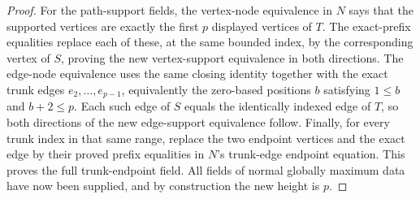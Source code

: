 \begin{proof}
For the path-support fields, the vertex-node equivalence in $N$ says that
the supported vertices are exactly the first $p$ displayed vertices of
$T$.  The exact-prefix equalities replace each of these, at the same
bounded index, by the corresponding vertex of $S$, proving the new
vertex-support equivalence in both directions.  The edge-node equivalence
uses the same closing identity together with the exact trunk edges
$e_2,\ldots,e_{p-1}$, equivalently the zero-based positions $b$ satisfying
$1\le b$ and $b+2\le p$.  Each such edge of $S$ equals the identically
indexed edge of $T$, so both directions of the new edge-support equivalence
follow.  Finally, for every trunk index in that same range, replace the two
endpoint vertices and the exact edge by their proved prefix equalities in
$N$'s trunk-edge endpoint equation.  This proves the full trunk-endpoint
field.  All fields of normal globally maximum data have now been supplied,
and by construction the new height is $p$.
\end{proof}
